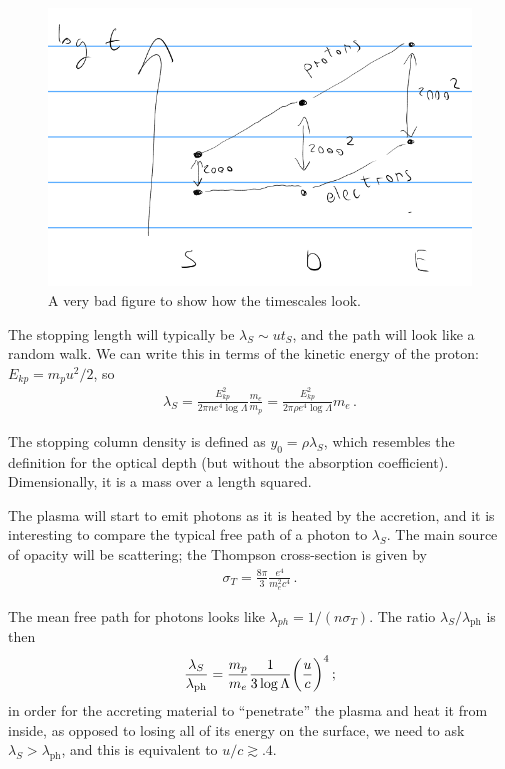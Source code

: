 \documentclass[main.tex]{subfiles}
\begin{document}
\begin{figure}[]
\centering
\includegraphics[width=\textwidth]{figures/timescales}
\caption{A very bad figure to show how the timescales look.}
\label{fig:timescales}
\end{figure}


The stopping length will typically be \(\lambda _S \sim u t_S\), and the path will look like a random walk. We can write this in terms of the kinetic energy of the proton: \(E_{kp} = m_p u^2 /2\), so  
%
\begin{align}
\lambda _S = \frac{E_{kp}^2}{2 \pi n e^4 \log \Lambda } \frac{m_e}{m_p} = \frac{E^2_{kp}}{2 \pi \rho e^{4} \log \Lambda } m_e
\,.
\end{align}

The stopping column density is defined as \(y_0 = \rho \lambda _S\), which resembles the definition for the optical depth (but without the absorption coefficient). Dimensionally, it is a mass over a length squared. 

The plasma will start to emit photons as it is heated by the accretion, and it is interesting to compare the typical free path of a photon to \(\lambda _S\). The main source of opacity will be scattering;
the Thompson cross-section is given by 
%
\begin{align}
\sigma _T = \frac{8 \pi }{3} \frac{e^{4}}{m_e^2 c^{4}}
\,.
\end{align}


The mean free path for photons looks like \(\lambda _{ph} = 1/ (n \sigma _T)\). The ratio \(\lambda _S / \lambda  _{\text{ph}}\) is then 
%
\begin{align}
\frac{\lambda_S}{\lambda_{\text{ph}}} = \frac{m_p}{m_e} \frac{1}{3 \log \Lambda } \qty( \frac{u}{c})^4
\,;
\end{align}
%
in order for the accreting material to ``penetrate'' the plasma and heat it from inside, as opposed to losing all of its energy on the surface, we need to ask \(\lambda _S > \lambda  _{\text{ph}}\),
and this is equivalent to \(u/c \gtrsim \num{.4}\).
\end{document}
